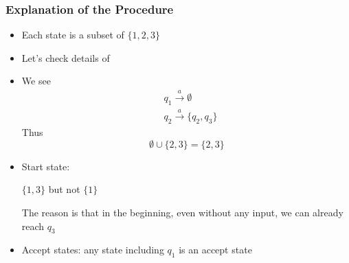 \begin{frame}[allowframebreaks]
  \frametitle{Explanation of the Procedure}
\begin{itemize}
\item Each state is a subset of $\{1,2,3\}$
\item Let's check details of

  \begin{center}
  \end{center}

\item We see
  \begin{equation*}
    \begin{split}
      & q_1 \xrightarrow{a} \emptyset\\
& q_2 \xrightarrow{a} \{q_2, q_3\}      
    \end{split}
  \end{equation*}
Thus
\begin{equation*}
  \emptyset \cup \{ 2, 3\} = \{2, 3\}
\end{equation*}
\item Start state:
  \begin{center}
    $\{1, 3\}$ but not $\{1\}$
  \end{center}
  The reason is that in the beginning, even without any
  input, we can already reach $q_3$
\item Accept states: any state including $q_1$ is an accept state
\end{itemize}
\end{frame}
